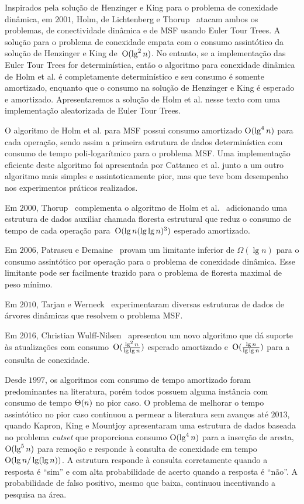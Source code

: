 Inspirados pela solução de Henzinger e King para o problema de conexidade dinâmica, em $2001$, Holm, de Lichtenberg e Thorup~\cite{poly_log} atacam ambos os problemas, de conectividade dinâmica e de MSF usando Euler Tour Trees.
A solução para o problema de conexidade empata com o consumo assintótico da solução de Henzinger e King de~$\mathrm{O}(\lg^2 n)$.
No entanto, se a implementação das Euler Tour Trees for determinística, então o algoritmo para conexidade dinâmica de Holm et al. é completamente determinístico e seu consumo é somente amortizado,
enquanto que o consumo na solução de Henzinger e King é esperado e amortizado. 
Apresentaremos a solução de Holm et al. nesse texto com uma implementação aleatorizada de Euler Tour Trees.

O algoritmo de Holm et al. para MSF possui consumo amortizado $\mathrm{O}(\lg^4 n)$ para cada operação, sendo assim a primeira estrutura de dados determinística com consumo de tempo poli-logarítmico para o problema MSF. Uma implementação eficiente deste algoritmo foi apresentada por Cattaneo et al. \cite{xpstudy2002} junto a um outro algoritmo mais simples e assintoticamente pior, mas que teve bom desempenho nos experimentos práticos realizados.

Em $2000$, Thorup~\cite{Thorup2000} complementa o algoritmo de Holm et al.~\cite{poly_log} adicionando uma estrutura de dados auxiliar chamada floresta estrutural que reduz o consumo de tempo de cada operação para~$\mathrm{O}(\lg n(\lg\lg n)^3)$ esperado amortizado.

Em $2006$, Patrascu e Demaine~\cite{lowerBoundPatrascu} provam um limitante inferior de $\Omega(\lg n)$ para o consumo assintótico por operação para o problema de conexidade dinâmica. Esse limitante pode ser facilmente trazido para o problema de floresta maximal de peso mínimo.

Em $2010$, Tarjan e Werneck~\cite{tarjanWerneck2010} experimentaram diversas estruturas de dados de árvores dinâmicas que resolvem o problema MSF.

Em 2016, Christian Wulff-Nilsen~\cite{Wulff-Nilsen2016} apresentou um novo algoritmo que dá suporte às atualizações com consumo~$\mathrm{O}(\frac{\lg^2 n}{\lg \lg n})$ esperado amortizado e~$\mathrm{O}(\frac{\lg n}{\lg \lg n})$ para a consulta de conexidade.

Desde $1997$, os algoritmos com consumo de tempo amortizado foram predominantes na literatura, porém todos possuem alguma instância com consumo de tempo $\Theta(n)$ no pior caso. O problema de melhorar o tempo assintótico no pior caso continuou a permear a literatura sem avanços até $2013$, quando Kapron, King e Mountjoy \cite{bruceM} apresentaram uma estrutura de dados baseada no problema \textit{cutset} que proporciona consumo $\mathrm{O}(\lg^4 n)$ para a inserção de aresta, $\mathrm{O}(\lg^5 n)$ para remoção e responde à consulta de conexidade em tempo $\mathrm{O}(\lg n / \lg(\lg n))$. A estrutura responde à consulta corretamente quando a resposta é “sim” e com alta probabilidade de acerto quando a resposta é “não”. A probabilidade de falso positivo, mesmo que baixa, continuou incentivando a pesquisa na área. 

